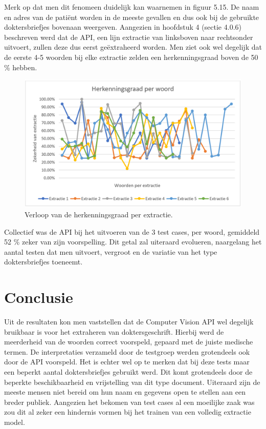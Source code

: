 Merk op dat men dit fenomeen duidelijk kan waarnemen in figuur 5.15. De naam en adres van de patiënt worden in de meeste gevallen en dus ook bij de gebruikte doktersbriefjes bovenaan weergeven. Aangezien in hoofdstuk 4 (sectie 4.0.6) beschreven werd dat de API, een lijn extractie van linksboven naar rechtsonder uitvoert, zullen deze dus eerst geëxtraheerd worden. Men ziet ook wel degelijk dat de eerste 4-5 woorden bij elke extractie zelden een herkenningsgraad boven de 50 \% hebben.


\begin{figure}[h]
	
	\includegraphics[width=\textwidth,height=\textheight,keepaspectratio]{../Foto's/herkenningsgraad_statistiek.png}
		\captionsetup{justification=centering,margin=2cm}
	\caption{Verloop van de herkenningsgraad per extractie.}
	\centering
\end{figure}

Collectief was de API bij het uitvoeren van de 3 test cases, per woord, gemiddeld 52 \% zeker van zijn voorspelling. Dit getal zal uiteraard evolueren, naargelang het aantal testen dat men uitvoert, vergroot en de variatie van het type doktersbriefjes toeneemt. 
\newpage
\section{Conclusie}
Uit de resultaten kon men vaststellen dat de Computer Vision API wel degelijk bruikbaar is voor het extraheren van doktersgeschrift. Hierbij werd de meerderheid van de woorden correct voorspeld, gepaard met de juiste medische termen. De interpretaties verzameld door de testgroep werden grotendeels ook door de API voorspeld. Het is echter wel op te merken dat bij deze tests maar een beperkt aantal doktersbriefjes gebruikt werd. Dit komt grotendeels door de beperkte beschikbaarheid en vrijstelling van dit type document. Uiteraard zijn de meeste mensen niet bereid om hun naam en gegevens open te stellen aan een breder publiek. Aangezien het bekomen van test cases al een moeilijke zaak was zou dit al zeker een hindernis vormen bij het trainen van een volledig extractie model. 


